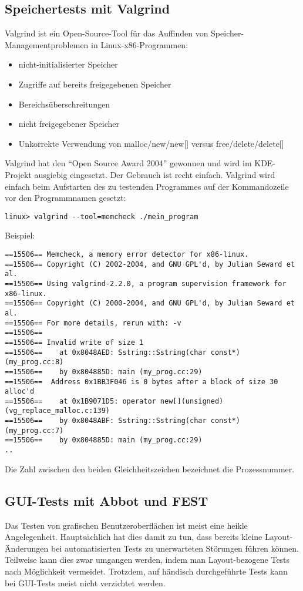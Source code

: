 \subsection{Speichertests mit Valgrind}
Valgrind ist ein Open-Source-Tool für das Auffinden von
Speicher-Managementproblemen in Linux-x86-Programmen:
\begin{itemize}
\item nicht-initialisierter Speicher
\item Zugriffe auf bereits freigegebenen Speicher
\item Bereichsüberschreitungen
\item nicht freigegebener Speicher
\item Unkorrekte Verwendung von malloc/new/new[] versus free/delete/delete[]
\end{itemize}
Valgrind hat den ``Open Source Award 2004'' gewonnen und wird im
KDE-Projekt ausgiebig eingesetzt. Der Gebrauch ist recht einfach. Valgrind
wird einfach beim Aufstarten des  zu testenden Programmes auf der
Kommandozeile vor den Programmnamen gesetzt:
\begin{verbatim}
linux> valgrind --tool=memcheck ./mein_program
\end{verbatim}
Beispiel:
{
\ifslides\footnotesize
\else\small
\fi
\begin{verbatim}
==15506== Memcheck, a memory error detector for x86-linux.
==15506== Copyright (C) 2002-2004, and GNU GPL'd, by Julian Seward et al.
==15506== Using valgrind-2.2.0, a program supervision framework for x86-linux.
==15506== Copyright (C) 2000-2004, and GNU GPL'd, by Julian Seward et al.
==15506== For more details, rerun with: -v
==15506==
==15506== Invalid write of size 1
==15506==    at 0x8048AED: Sstring::Sstring(char const*) (my_prog.cc:8)
==15506==    by 0x804885D: main (my_prog.cc:29)
==15506==  Address 0x1BB3F046 is 0 bytes after a block of size 30 alloc'd
==15506==    at 0x1B9071D5: operator new[](unsigned) (vg_replace_malloc.c:139)
==15506==    by 0x8048ABF: Sstring::Sstring(char const*) (my_prog.cc:7)
==15506==    by 0x804885D: main (my_prog.cc:29)
..
\end{verbatim}
}
\ifslides
\else
Die Zahl zwischen den beiden Gleichheitszeichen bezeichnet die Prozessnummer.
\fi
%
\newpage
\subsection{GUI-Tests mit Abbot und FEST}
Das Testen von grafischen Benutzeroberflächen
ist meist eine heikle Angelegenheit. Hauptsächlich hat dies
damit zu tun, dass bereits kleine Layout-Änderungen bei
automatisierten Tests zu unerwarteten Störungen führen können.
Teilweise kann dies zwar umgangen werden,
indem man Layout-bezogene Tests nach Möglichkeit vermeidet. Trotzdem, auf
händisch durchgeführte Tests kann bei GUI-Tests meist nicht verzichtet werden.


